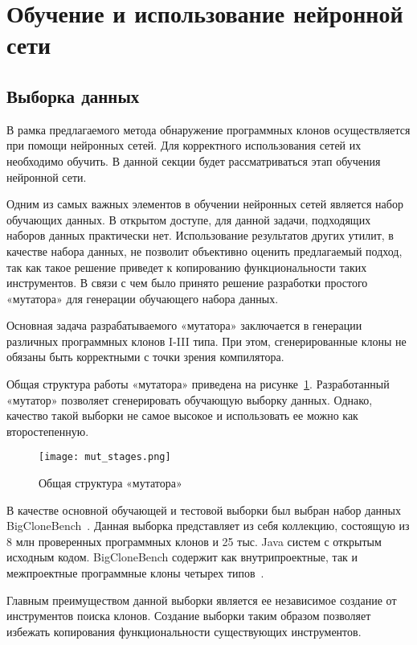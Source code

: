 \section{Обучение и использование нейронной сети}

\subsection{Выборка данных}

В рамка предлагаемого метода обнаружение программных клонов осуществляется при помощи нейронных сетей. Для корректного использования сетей их необходимо обучить. В данной секции будет рассматриваться этап обучения нейронной сети.

Одним из самых важных элементов в обучении нейронных сетей является набор обучающих данных. В открытом доступе, для данной задачи, подходящих наборов данных практически нет. Использование результатов других утилит, в качестве набора данных, не позволит объективно оценить предлагаемый подход, так как такое решение приведет к копированию функциональности таких инструментов. В связи с чем было принято решение разработки простого «мутатора» для генерации обучающего набора данных.

Основная задача разрабатываемого «мутатора» заключается в генерации различных программных клонов I-III типа. При этом, сгенерированные клоны не обязаны быть корректными с точки зрения компилятора.

Общая структура работы «мутатора» приведена на рисунке~\ref{fig:mut_stages}. Разработанный «мутатор» позволяет сгенерировать обучающую выборку данных. Однако, качество такой выборки не самое высокое и использовать ее можно как второстепенную.

\begin{figure}[htbp]
\centering
\texttt{[image: mut\_stages.png]}
\caption{Общая структура «мутатора»}
\label{fig:mut_stages}
\end{figure}

В качестве основной обучающей и тестовой выборки был выбран набор данных BigCloneBench~\cite{bcb}. Данная выборка представляет из себя коллекцию, состоящую из 8 млн проверенных программных клонов и 25 тыс. Java систем с открытым исходным кодом. BigCloneBench содержит как внутрипроектные, так и межпроектные программные клоны четырех типов~\cite{bcb}.

Главным преимуществом данной выборки является ее независимое создание от инструментов поиска клонов. Создание выборки таким образом позволяет избежать копирования функциональности существующих инструментов. 

